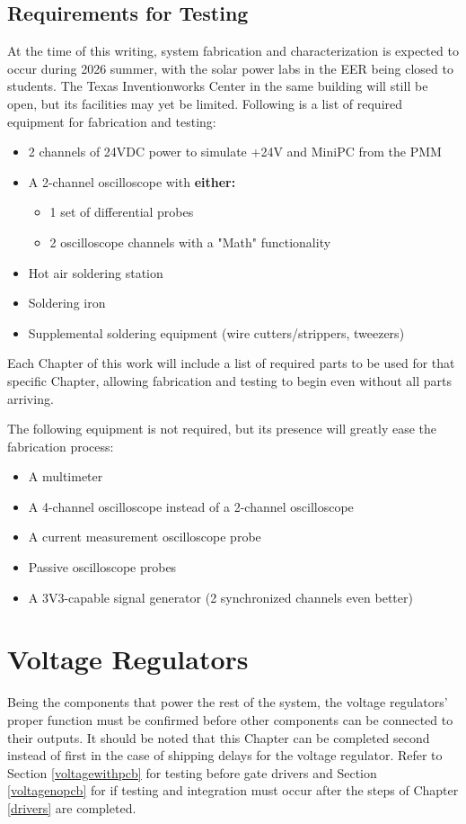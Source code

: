 \documentclass[]{report}
\begin{document}
\section{Requirements for Testing}
At the time of this writing, system fabrication and characterization is expected to occur during 2026 summer, with the solar power labs in the EER being closed to students. The Texas Inventionworks Center in the same building will still be open, but its facilities may yet be limited. Following is a list of required equipment for fabrication and testing: 
\begin{itemize}
	\item 2 channels of 24VDC power to simulate +24V and MiniPC from the PMM
	\item A 2-channel oscilloscope with \textbf{either:} 
	\begin{itemize}
		\item 1 set of differential probes
		\item 2 oscilloscope channels with a "Math" functionality
	\end{itemize}
	\item Hot air soldering station
	\item Soldering iron
	\item Supplemental soldering equipment (wire cutters/strippers, tweezers)
\end{itemize}
Each Chapter of this work will include a list of required parts to be used for that specific Chapter, allowing fabrication and testing to begin even without all parts arriving. \par
The following equipment is not required, but its presence will greatly ease the fabrication process:
\begin{itemize}
	\item A multimeter
	\item A 4-channel oscilloscope instead of a 2-channel oscilloscope
	\item A current measurement oscilloscope probe
	\item Passive oscilloscope probes
	\item A 3V3-capable signal generator (2 synchronized channels even better)
\end{itemize}
\chapter{Voltage Regulators}
Being the components that power the rest of the system, the voltage regulators' proper function must be confirmed before other components can be connected to their outputs. It should be noted that this Chapter can be completed second instead of first in the case of shipping delays for the voltage regulator. Refer to Section \ref{voltagewithpcb} for testing before gate drivers and Section \ref{voltagenopcb} for if testing and integration must occur after the steps of Chapter \ref{drivers} are completed. 
\end{document}
